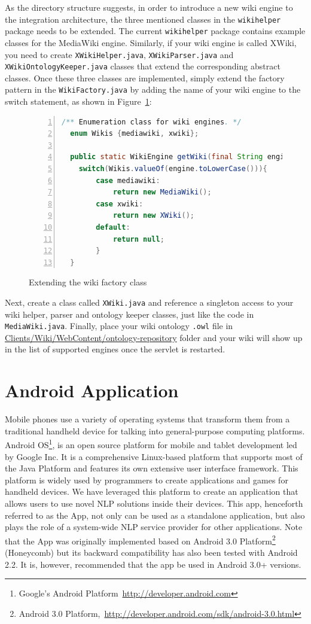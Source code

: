 As the directory structure suggests, in order to introduce a new wiki engine to the integration architecture, the three mentioned classes in the \texttt{wikihelper} package needs to be extended. The current \texttt{wikihelper} package contains example classes for the MediaWiki engine. Similarly, if your wiki engine is called XWiki, you need to create \texttt{XWikiHelper.java}, \texttt{XWikiParser.java} and \texttt{XWikiOntologyKeeper.java} classes that extend the corresponding abstract classes. Once these three classes are implemented, simply extend the factory pattern in the \texttt{WikiFactory.java} by adding the name of your wiki engine to the switch statement, as shown in Figure~\ref{list:wiki_factory_extend}:

\begin{figure}[h!]
\centering
\begin{lstlisting}[language=Java,numbers=left,xleftmargin=4mm,columns=flexible]
  /** Enumeration class for wiki engines. */
  enum Wikis {mediawiki, xwiki};

  public static WikiEngine getWiki(final String engine){
    switch(Wikis.valueOf(engine.toLowerCase())){
		case mediawiki:
			return new MediaWiki();
		case xwiki:
			return new XWiki();
		default:
			return null;
		}
  }
\end{lstlisting}
\caption{Extending the wiki factory class}
\label{list:wiki_factory_extend}
\end{figure}

Next, create a class called \texttt{XWiki.java} and reference a singleton access to your wiki helper, parser and ontology keeper classes, just like the code in \texttt{MediaWiki.java}. Finally, place your wiki ontology \texttt{.owl} file in \url{Clients/Wiki/WebContent/ontology-repository} folder and your wiki will show up in the list of supported engines once the servlet is restarted.

\section{Android Application}
Mobile phones use a variety of operating systems that transform them from a traditional handheld device for talking into general-purpose computing platforms. Android OS\footnote{Google's Android Platform~\url{http://developer.android.com}}, is an open source platform for mobile and tablet development led by Google Inc. It is a comprehensive Linux-based platform that supports most of the Java Platform and features its own extensive user interface framework. This platform is widely used by programmers to create applications and games for handheld devices. We have leveraged this platform to create an application that allows users to use novel NLP solutions inside their devices. This app, henceforth referred to as the \sa App, not only can be used as a standalone application, but also plays the role of a system-wide NLP service provider for other applications. Note that the \sa App was originally implemented based on Android 3.0 Platform\footnote{Android 3.0 Platform,~\url{http://developer.android.com/sdk/android-3.0.html}} (Honeycomb) but its backward compatibility has also been tested with Android 2.2. It is, however, recommended that the app be used in Android 3.0+ versions.

